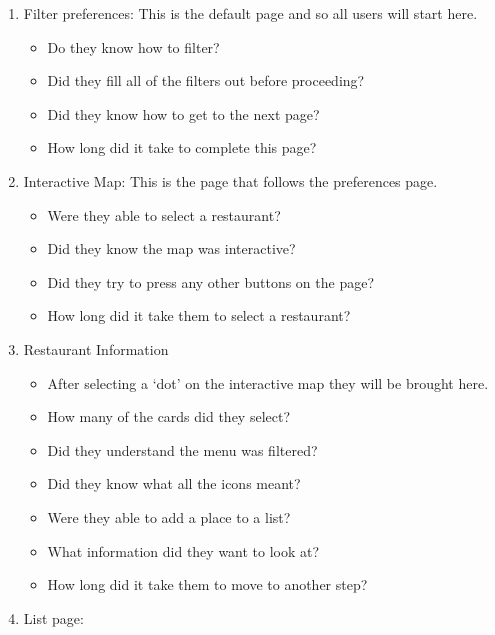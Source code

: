         \begin{enumerate}
            \item Filter preferences: 
            This is the default page and so all users will start here.
                \begin{itemize}
                    \item Do they know how to filter?
                    \item Did they fill all of the filters out before proceeding?
                    \item Did they know how to get to the next page?
                    \item How long did it take to complete this page?
                \end{itemize} 
            \item Interactive Map:
            This is the page that follows the preferences page.
                \begin{itemize}
                    \item Were they able to select a restaurant?
                    \item Did they know the map was interactive?
                    \item Did they try to press any other buttons on the page?
                    \item How long did it take them to select a restaurant?
                \end{itemize}
            \item Restaurant Information
                \begin{itemize}
                    \item After selecting a ‘dot’ on the interactive map they will be brought here. 
                    \item How many of the cards did they select?
                    \item Did they understand the menu was filtered?
                    \item Did they know what all the icons meant?
                    \item Were they able to add a place to a list?
                    \item What information did they want to look at?
                    \item How long did it take them to move to another step?
                \end{itemize}
            \item List page:

\end{enumerate}
